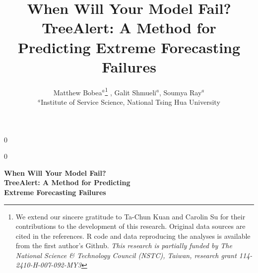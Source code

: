 \documentclass[12pt]{article}
\newcommand{\blind}{0}
\begin{document}

\def\spacingset#1{\renewcommand{\baselinestretch}%
{#1}\small\normalsize} \spacingset{1}


\blind
{
  \title{When Will Your Model Fail?\\TreeAlert: A Method for Predicting Extreme Forecasting Failures}
  \author{Matthew Bobea$^{a}$\thanks{We extend our sincere gratitude to Ta-Chun Kuan and Carolin Su for their contributions to the development of this research. Original data sources are cited in the references. R code and data reproducing the analyses is available from the first author's Github. \textit{This research is partially funded by The National Science \& Technology Council (NSTC), Taiwan, research grant 114-2410-H-007-092-MY3}}%
    , Galit Shmueli$^{a}$, %
    Soumya Ray$^{a}$ \\[6pt]
    $^{a}$Institute of Service Science, National Tsing Hua University}
  \maketitle
  
} \fi
{}\blind
{
  \bigskip
  \bigskip
  \bigskip
  \begin{center}
    {\LARGE\bf When Will Your Model Fail?}\\[10pt]
    {\LARGE\bf TreeAlert: A Method for Predicting}\\[10pt] 
    {\LARGE\bf Extreme Forecasting Failures}
  \end{center}
  \medskip
} \fi
\end{document}

